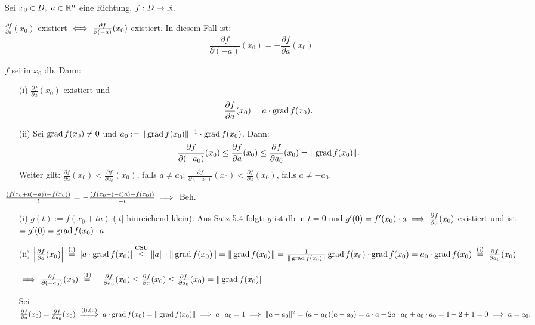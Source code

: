 \documentclass[a4paper,twoside,DIV15,BCOR12mm,chapterprefix=true,headings=twolinechapter]{scrbook}
\begin{document}
\begin{satz}[Richtungsableitungen]
Sei $x_0 \in D,\ a \in \mathbb{R}^n$ eine Richtung, $f:D \to \mathbb{R}$.
\begin{liste}
\item $\frac{\partial f}{\partial a}(x_0)$ existiert $\iff \frac{\partial f}{\partial (-a)}(x_0)$ existiert. In diesem Fall ist: $$\frac{\partial f}{\partial (-a)}(x_0) = -\frac{\partial f}{\partial a}(x_0)$$
\item $f$ sei in $x_0$ db. Dann:
\begin{enumerate}
\item[(i)] $\frac{\partial f}{\partial a}(x_0)$ existiert und $$\frac{\partial f}{\partial a}(x_0) = a\cdot \mathop{\rm grad}\nolimits f(x_0).$$
\item[(ii)] Sei $\mathop{\rm grad}\nolimits f(x_0) \ne 0$ und $a_0 := \|\mathop{\rm grad}\nolimits f(x_0)\|^{-1}\cdot \mathop{\rm grad}\nolimits f(x_0)$. Dann: $$\frac{\partial f}{\partial (-a_0)}(x_0) \le \frac{\partial f}{\partial a}(x_0) \le \frac{\partial f}{\partial a_0}(x_0) = \|\mathop{\rm grad}\nolimits f(x_0)\|.$$ Weiter gilt: $\frac{\partial f}{\partial a}(x_0) < \frac{\partial f}{\partial a_0}(x_0)$, falls $a \ne a_0$; $\frac{\partial f}{\partial (-a_0)}(x_0) < \frac{\partial f}{\partial a}(x_0)$, falls $a \ne -a_0$.
\end{enumerate}
\end{liste}
\end{satz}

\begin{beweis}
\begin{liste}
\item $\frac{(f(x_0+t(-a))-f(x_0))}{t} = -\frac{(f(x_0+(-t)a)-f(x_0))}{-t} \implies$ Beh.
\item \begin{enumerate}
\item[(i)] $g(t) := f(x_0+ta)$ ($|t|$ hinreichend klein). Aus Satz 5.4 folgt: $g$ ist db in $t=0$ und $g'(0) = f'(x_0) \cdot a \implies \frac{\partial f}{\partial a}(x_0)$ existiert und ist $= g'(0) = \mathop{\rm grad}\nolimits f(x_0)\cdot a$
\item[(ii)] $\left| \frac{\partial f}{\partial a}(x_0) \right| \gleichnach{(i)} |a\cdot \grad f(x_0)| \overset{\text{CSU}}{\le} \|a\|\cdot \|\grad f(x_0)\| = \|\grad f(x_0)\| = \frac{1}{\|\grad f(x_0)\|} \grad f(x_0) \cdot \grad f(x_0) = a_0\cdot \grad f(x_0) \gleichnach{(i)} \frac{\partial f}{\partial a_0}(x_0)$

$\folgt \frac{\partial f}{\partial (-a_0)}(x_0) \gleichnach{(1)} -\frac{\partial f}{\partial a_0}(x_0) \le \frac{\partial f}{\partial a}(x_0) \le \frac{\partial f}{\partial a_0}(x_0) = \|\grad f(x_0)\|$

Sei $\frac{\partial f}{\partial a}(x_0) = \frac{\partial f}{\partial a_0}(x_0) \folgtnach{(i),(ii)} a\cdot\grad f(x_0) = \|\grad f(x_0)\| \folgt a\cdot a_0 = 1 \folgt \|a-a_0\|^2 = (a-a_0)(a-a_0) = a\cdot a - 2a\cdot a_0 + a_0\cdot a_0 = 1-2+1 = 0 \folgt a=a_0.$
\end{enumerate}
\end{liste}
\end{beweis}
\end{document}
